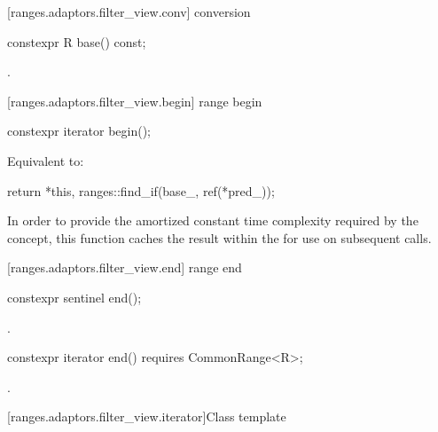 [ranges.adaptors.filter_view.conv]{ conversion}

%
\begin{itemdecl}
constexpr R base() const;
\end{itemdecl}

\begin{itemdescr}
\pnum
\returns {}.
\end{itemdescr}

[ranges.adaptors.filter_view.begin]{ range begin}

%
\begin{itemdecl}
constexpr iterator begin();
\end{itemdecl}

\begin{itemdescr}
\pnum
\effects Equivalent to:
\begin{codeblock}
return {*this, ranges::find_if(base_, ref(*pred_))};
\end{codeblock}

\pnum
\remarks In order to provide the amortized constant time complexity required by
the  concept, this function caches the result within the
 for use on subsequent calls.
\end{itemdescr}

[ranges.adaptors.filter_view.end]{ range end}

%
\begin{itemdecl}
constexpr sentinel end();
\end{itemdecl}

\begin{itemdescr}
\pnum
\returns {}.
\end{itemdescr}

\begin{itemdecl}
constexpr iterator end() requires CommonRange<R>;
\end{itemdecl}

\begin{itemdescr}
\pnum
\returns {}.
\end{itemdescr}

[ranges.adaptors.filter_view.iterator]{Class template }

